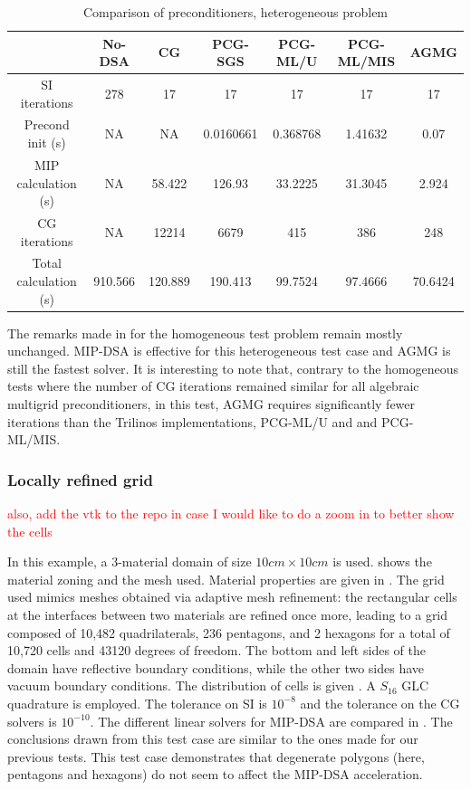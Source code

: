 %
%
\begin{table}[!htbp]
  \begin{center}
    \caption{Comparison of preconditioners, heterogeneous problem}
    \begin{tabular}{|c|c|c|c|c|c|c|}
      \hline
      & No-DSA & CG & PCG-SGS & PCG-ML/U & PCG-ML/MIS & AGMG\\
      \hline
      SI iterations & 278     & 17      & 17        & 17       & 17      & 17  \\
   Precond init (s) & NA      & NA      & 0.0160661 & 0.368768 & 1.41632 &
      0.07  \\
MIP calculation (s) & NA      & 58.422  & 126.93    & 33.2225  & 31.3045 &
      2.924 \\
      CG iterations & NA      & 12214   & 6679      & 415      & 386     & 248  \\
Total calculation (s) & 910.566 & 120.889 & 190.413 & 99.7524  & 97.4666 &
      70.6424 \\      
      \hline
    \end{tabular}
    \label{comparison_hex}
  \end{center}
\end{table}
%
The remarks made in  for the homogeneous test problem
remain mostly unchanged. MIP-DSA is effective for this heterogeneous test case and AGMG is
still the fastest solver. It is interesting to note that, contrary to the
homogeneous tests where the number of CG iterations remained similar for all
algebraic multigrid preconditioners, in this test, AGMG requires
significantly fewer iterations than the Trilinos implementations, PCG-ML/U and and PCG-ML/MIS.

\subsubsection{Locally refined grid}

\textcolor{red}{also, add the vtk to the repo in case I would like to do a zoom in to better show the cells}

In this example, a 3-material domain of size $10cm\times 10cm$ is used. 
 shows the material zoning and the mesh used. Material properties 
are given in . The grid used mimics meshes obtained via adaptive mesh
refinement: the rectangular cells at the interfaces between two materials are refined once more,
leading to a grid composed of 10,482 quadrilaterals, 236 pentagons,
and 2 hexagons for a total of 10,720 cells and 43120 degrees of freedom. The bottom
and left sides of the domain have reflective boundary conditions, while the other two sides
have vacuum boundary conditions. 
%
The distribution of cells is given .
A $S_{16}$ GLC quadrature is employed. The tolerance on SI is $10^{-8}$ and
the tolerance on the CG solvers is $10^{-10}$.
The different linear solvers for MIP-DSA are compared in .
%
The conclusions drawn from this test case are similar to the ones made for 
our previous tests. This test case demonstrates that degenerate polygons 
(here, pentagons and hexagons) do not seem to affect the MIP-DSA acceleration.


